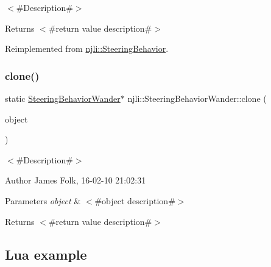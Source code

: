 $<$\#\+Description\#$>$

\begin{DoxyReturn}{Returns}
$<$\#return value description\#$>$ 
\end{DoxyReturn}


Reimplemented from \mbox{\hyperlink{classnjli_1_1_steering_behavior_abbc461d853c1b225cfde5b79d96d11bd}{njli\+::\+Steering\+Behavior}}.

\mbox{\label{classnjli_1_1_steering_behavior_wander_ad42ad6cdb3eb7e6b479f6faa314cb991}} 
\subsubsection{\texorpdfstring{clone()}{clone()}}
{\footnotesize\ttfamily static \mbox{\hyperlink{classnjli_1_1_steering_behavior_wander}{Steering\+Behavior\+Wander}}$\ast$ njli\+::\+Steering\+Behavior\+Wander\+::clone (\begin{DoxyParamCaption}\item[{const \mbox{\hyperlink{classnjli_1_1_steering_behavior_wander}{Steering\+Behavior\+Wander}} \&}]{object }\end{DoxyParamCaption})\hspace{0.3cm}{\ttfamily [static]}}



$<$\#\+Description\#$>$ 

\begin{DoxyAuthor}{Author}
James Folk, 16-\/02-\/10 21\+:02\+:31
\end{DoxyAuthor}

\begin{DoxyParams}{Parameters}
{\em object} & $<$\#object description\#$>$\\
\hline
\end{DoxyParams}
\begin{DoxyReturn}{Returns}
$<$\#return value description\#$>$
\end{DoxyReturn}
\hypertarget{classnjli_1_1_steering_behavior_wander_ex1}{}\subsection{Lua example}\label{classnjli_1_1_steering_behavior_wander_ex1}

